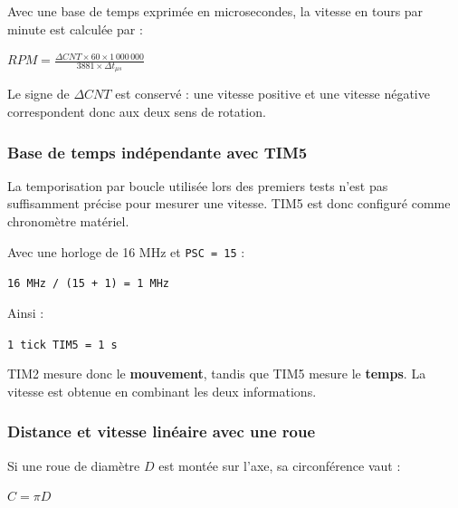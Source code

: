 \documentclass[11pt,a4paper]{article}
\begin{document}
	Avec une base de temps exprimée en microsecondes, la vitesse en tours par minute est calculée par :
	
	\begin{center}
		$RPM = \frac{\Delta CNT \times 60 \times 1\,000\,000}{3881 \times \Delta t_{\mu s}}$
	\end{center}
	
	Le signe de $\Delta CNT$ est conservé : une vitesse positive et une vitesse négative correspondent donc aux deux sens de rotation.
	
	\subsubsection*{Base de temps indépendante avec TIM5}
	
	La temporisation par boucle utilisée lors des premiers tests n'est pas suffisamment précise pour mesurer une vitesse. TIM5 est donc configuré comme chronomètre matériel.
	
	Avec une horloge de 16 MHz et \texttt{PSC = 15} :
	
	\begin{center}
		\texttt{16 MHz / (15 + 1) = 1 MHz}
	\end{center}
	
	Ainsi :
	
	\begin{center}
		\texttt{1 tick TIM5 = 1 \textmu s}
	\end{center}
	
	TIM2 mesure donc le \textbf{mouvement}, tandis que TIM5 mesure le \textbf{temps}. La vitesse est obtenue en combinant les deux informations.
	
	\begin{center}
	\end{center}
	
	\subsubsection*{Distance et vitesse linéaire avec une roue}
	
	Si une roue de diamètre $D$ est montée sur l'axe, sa circonférence vaut :
	
	\begin{center}
		$C = \pi D$
	\end{center}
	
\end{document}
